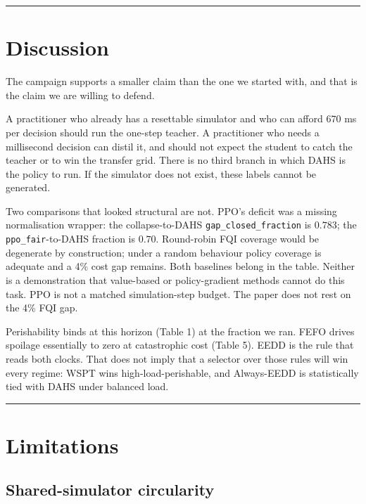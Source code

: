 \documentclass[review,3p,times]{elsarticle}
\theoremstyle{definition}
\begin{document}
\begin{center}\rule{0.5\linewidth}{0.5pt}\end{center}

\section{Discussion}\label{discussion}

The campaign supports a smaller claim than the one we started with, and
that is the claim we are willing to defend.

A practitioner who already has a resettable simulator and who can afford
\(670\) ms per decision should run the one-step teacher. A practitioner
who needs a millisecond decision can distil it, and should not expect
the student to catch the teacher or to win the transfer grid. There is
no third branch in which DAHS is the policy to run. If the simulator
does not exist, these labels cannot be generated.

Two comparisons that looked structural are not. PPO's deficit was a
missing normalisation wrapper: the collapse-to-DAHS
\texttt{gap\_closed\_fraction} is \(0.783\); the
\texttt{ppo\_fair}-to-DAHS fraction is \(0.70\). Round-robin FQI
coverage would be degenerate by construction; under a random behaviour
policy coverage is adequate and a 4\% cost gap remains. Both baselines
belong in the table. Neither is a demonstration that value-based or
policy-gradient methods cannot do this task. PPO is not a matched
simulation-step budget. The paper does not rest on the 4\% FQI gap.

Perishability binds at this horizon (Table 1) at the fraction we ran.
FEFO drives spoilage essentially to zero at catastrophic cost (Table 5).
EEDD is the rule that reads both clocks. That does not imply that a
selector over those rules will win every regime: WSPT wins
high-load-perishable, and Always-EEDD is statistically tied with DAHS
under balanced load.

\begin{center}\rule{0.5\linewidth}{0.5pt}\end{center}

\section{Limitations}\label{limitations}

\subsection{Shared-simulator
circularity}\label{shared-simulator-circularity}
\end{document}
